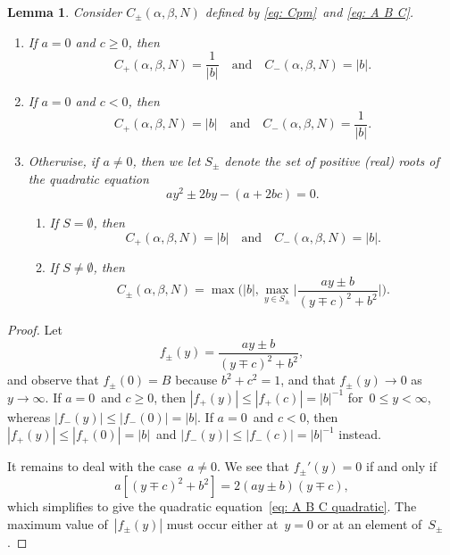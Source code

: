 \documentclass[12pt,a4paper]{article}
\newtheorem{lemma}[theorem]{Lemma}
\begin{document}
\begin{lemma}
Consider $C_\pm(\alpha,\beta,N)$ defined by \eqref{eq: Cpm}~and 
\eqref{eq: A B C}.
\begin{enumerate}
\item
If $a=0$ and $c\ge0$, then
\[
C_+(\alpha, \beta, N)=\frac{1}{|b|}\quad\text{and}\quad
C_-(\alpha, \beta, N)=|b|.
\]
\item 
If $a=0$ and $c<0$, then
\[
C_+(\alpha, \beta, N)=|b|\quad\text{and}\quad
C_-(\alpha, \beta, N)=\frac{1}{|b|}.
\]
\item
Otherwise, if $a\ne0$, then we let $S_\pm$ denote the set of positive (real) 
roots of the quadratic equation
\begin{equation}\label{eq: A B C quadratic}
ay^2\pm2by-(a+2bc)=0.
\end{equation}
\begin{enumerate}
\item If $S=\emptyset$, then
\[
C_+(\alpha, \beta, N)=|b|\quad\text{and}\quad C_-(\alpha, \beta, N)=|b|.
\]
\item If $S\ne\emptyset$, then
\[
C_\pm(\alpha,\beta,N)=\max\biggl(|b|,
\max_{y\in S_\pm}\biggl|\frac{ay\pm b}{(y\mp c)^2+b^2}\biggr|\biggr).
\]
\end{enumerate}
\end{enumerate}
\end{lemma}
\begin{proof}
Let
\[
f_\pm(y)=\frac{ay\pm b}{(y\mp c)^2+b^2},
\]
and observe that $f_\pm(0)=B$ because $b^2+c^2=1$, and that $f_\pm(y)\to0$ 
as~$y\to\infty$.  If $a=0$~and $c\ge0$, then $|f_+(y)|\le|f_+(c)|=|b|^{-1}$
for~$0\le y<\infty$, whereas $|f_-(y)|\le|f_-(0)|=|b|$.  If $a=0$~and $c<0$,
then $|f_+(y)|\le|f_+(0)|=|b|$~and $|f_-(y)|\le|f_-(c)|=|b|^{-1}$ instead.

It remains to deal with the case~$a\ne0$.  We see that $f_\pm'(y)=0$ if and 
only if
\[
a[(y\mp c)^2+b^2]=2(ay\pm b)(y\mp c),
\]
which simplifies to give the quadratic equation~\eqref{eq: A B C quadratic}.
The maximum value of~$|f_\pm(y)|$ must occur either at~$y=0$ or at an element 
of~$S_\pm$.
\end{proof}
\end{document}
